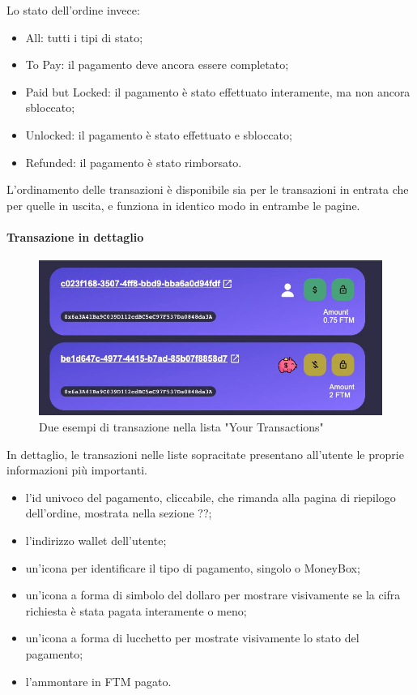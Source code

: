             Lo stato dell'ordine invece:
            \begin{itemize}
             \item All: tutti i tipi di stato;
                \item To Pay: il pagamento deve ancora essere completato;
                \item Paid but Locked: il pagamento è stato effettuato interamente, ma non ancora sbloccato;
                \item Unlocked: il pagamento è stato effettuato e sbloccato;
                \item Refunded: il pagamento è stato rimborsato.
            \end{itemize}

            L'ordinamento delle transazioni è disponibile sia per le transazioni in entrata che per quelle in uscita, e funziona in identico modo in entrambe le pagine.

            \paragraph{Transazione in dettaglio}

            \begin{figure}[H]
                \centering
                \includegraphics[scale=0.4]{immagini/transactionsmall.jpg}
                \caption{Due esempi di transazione nella lista "Your Transactions"}
            \end{figure}

            In dettaglio, le transazioni nelle liste sopracitate presentano all'utente le proprie informazioni più importanti.

            \begin{itemize}
                \item l'id univoco del pagamento, cliccabile, che rimanda alla pagina di riepilogo dell'ordine, mostrata nella sezione ??;
                \item l'indirizzo wallet dell'utente;
                \item un'icona per identificare il tipo di pagamento, singolo o MoneyBox;
                \item un'icona a forma di simbolo del dollaro per mostrare visivamente se la cifra richiesta è stata pagata interamente o meno;
                \item un'icona a forma di lucchetto per mostrate visivamente lo stato del pagamento;
                \item l'ammontare in FTM pagato.
            \end{itemize}

